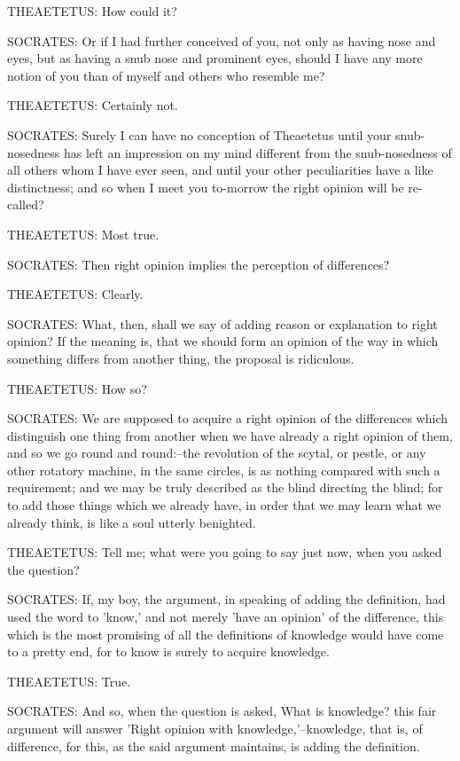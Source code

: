 THEAETETUS: How could it?

SOCRATES: Or if I had further conceived of you, not only as having nose
and eyes, but as having a snub nose and prominent eyes, should I have
any more notion of you than of myself and others who resemble me?

THEAETETUS: Certainly not.

SOCRATES: Surely I can have no conception of Theaetetus until your
snub-nosedness has left an impression on my mind different from the
snub-nosedness of all others whom I have ever seen, and until your other
peculiarities have a like distinctness; and so when I meet you to-morrow
the right opinion will be re-called?

THEAETETUS: Most true.

SOCRATES: Then right opinion implies the perception of differences?

THEAETETUS: Clearly.

SOCRATES: What, then, shall we say of adding reason or explanation to
right opinion? If the meaning is, that we should form an opinion of
the way in which something differs from another thing, the proposal is
ridiculous.

THEAETETUS: How so?

SOCRATES: We are supposed to acquire a right opinion of the differences
which distinguish one thing from another when we have already a right
opinion of them, and so we go round and round:--the revolution of the
scytal, or pestle, or any other rotatory machine, in the same circles,
is as nothing compared with such a requirement; and we may be truly
described as the blind directing the blind; for to add those things
which we already have, in order that we may learn what we already think,
is like a soul utterly benighted.

THEAETETUS: Tell me; what were you going to say just now, when you asked
the question?

SOCRATES: If, my boy, the argument, in speaking of adding the
definition, had used the word to 'know,' and not merely 'have an
opinion' of the difference, this which is the most promising of all the
definitions of knowledge would have come to a pretty end, for to know is
surely to acquire knowledge.

THEAETETUS: True.

SOCRATES: And so, when the question is asked, What is knowledge? this
fair argument will answer 'Right opinion with knowledge,'--knowledge,
that is, of difference, for this, as the said argument maintains, is
adding the definition.

